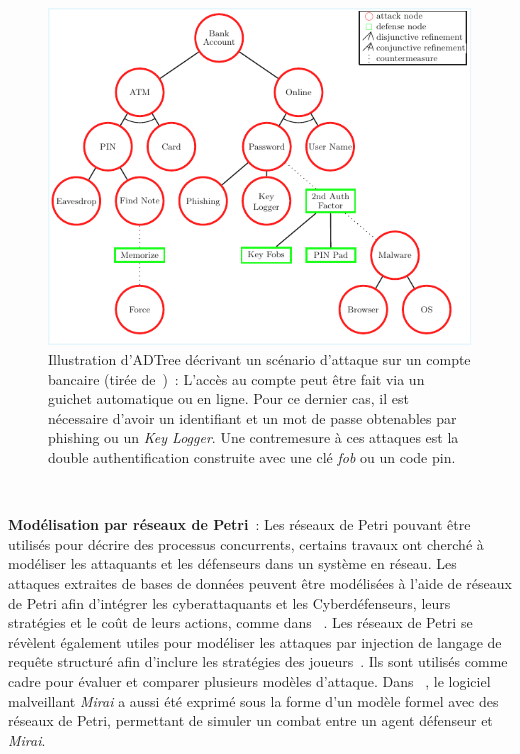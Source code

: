 \begin{figure}[h!]
  \centering
  \includegraphics[width=\linewidth]{figures/adt.pdf}
  \caption[Illustration d'ADTree d'un scénario d'attaque sur un compte bancaire (tirée de~\cite{BKordy2010})]{Illustration d'ADTree décrivant un scénario d'attaque sur un compte bancaire (tirée de~\cite{BKordy2010})~: L'accès au compte peut être fait via un guichet automatique ou en ligne. Pour ce dernier cas, il est nécessaire d'avoir un identifiant et un mot de passe obtenables par phishing ou un \textit{Key Logger}. Une contremesure à ces attaques est la double authentification construite avec une clé \textit{fob} ou un code pin.}
  \label{fig:bank_attack_defense_tree}
\end{figure}

\

\noindent
\textbf{Modélisation par réseaux de Petri}~: \quad Les réseaux de Petri pouvant être utilisés pour décrire des processus concurrents, certains travaux ont cherché à modéliser les attaquants et les défenseurs dans un système en réseau.
Les attaques extraites de bases de données peuvent être modélisées à l'aide de réseaux de Petri afin d'intégrer les cyberattaquants et les Cyberdéfenseurs, leurs stratégies et le coût de leurs actions, comme dans ~\cite{MPetty2022}. Les réseaux de Petri se révèlent également utiles pour modéliser les attaques par injection de langage de requête structuré afin d'inclure les stratégies des joueurs~\cite{JBland2020}.
Ils sont utilisés comme cadre pour évaluer et comparer plusieurs modèles d'attaque.
Dans ~\cite{SYamaguchi2020}, le logiciel malveillant \textit{Mirai} a aussi été exprimé sous la forme d'un modèle formel avec des réseaux de Petri, permettant de simuler un combat entre un agent défenseur et \textit{Mirai}.

